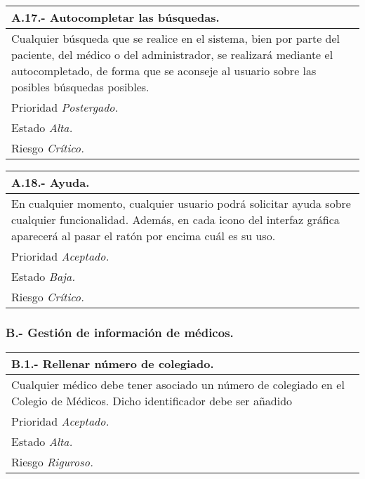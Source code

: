 	\begin{center}
	\begin{tabulary}{15cm}{|L|}
		\hline
			\bf{A.17.- Autocompletar las búsquedas.} \\
		\hline
			Cualquier búsqueda que se realice en el sistema, bien por parte del paciente, del médico o del administrador, se realizará mediante el autocompletado, de forma que se aconseje al usuario sobre las posibles búsquedas posibles. \\
		\hline
			Prioridad \textit{Postergado.} \\
		\hline
			Estado \textit{Alta.} \\
		\hline
			Riesgo \textit{Crítico.} \\
		\hline
	\end{tabulary}
	\end{center}

	\begin{center}
	\begin{tabulary}{15cm}{|L|}
		\hline
			\bf{A.18.- Ayuda.} \\
		\hline
			En cualquier momento, cualquier usuario podrá solicitar ayuda sobre cualquier funcionalidad. Además, en cada icono del interfaz gráfica aparecerá al pasar el ratón por encima cuál es su uso. \\
		\hline
			Prioridad \textit{Aceptado.} \\
		\hline
			Estado \textit{Baja.} \\
		\hline
			Riesgo \textit{Crítico.} \\
		\hline
	\end{tabulary}
	\end{center}


	\subsubsection{B.- Gestión de información de médicos.}

	\begin{center}
	\begin{tabulary}{15cm}{|L|}
		\hline
			\bf{B.1.- Rellenar número de colegiado.} \\
		\hline
			Cualquier médico debe tener asociado un número de colegiado en el Colegio de Médicos. Dicho identificador debe ser añadido \\
		\hline
			Prioridad \textit{Aceptado.} \\
		\hline
			Estado \textit{Alta.} \\
		\hline
			Riesgo \textit{Riguroso.} \\
		\hline
	\end{tabulary}
	\end{center}

